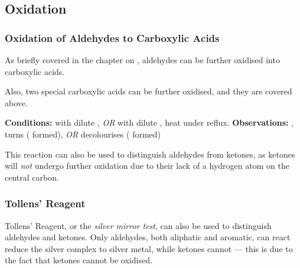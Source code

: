 

		\subsection{Oxidation}

			\subsubsection{Oxidation of Aldehydes to Carboxylic Acids}

				As briefly covered in the chapter on \hyperlink{CompleteOxidationOfPrimaryAlcohols}{}, aldehydes can be
				further oxidised into carboxylic acids.

				Also, two special carboxylic acids can be further oxidised, and they are covered above.

				\vspace{1.5em}
				\vbox{\textbf{Conditions:}	\tabto{35mm} with dilute , \textit{OR}  with dilute ,
											\tabto{35mm}heat under reflux.}
				\vspace{0.75em}
				\vbox{\textbf{Observations:}\tabto{35mm} , turns 
														( formed), \textit{OR}
											\tabto{35mm}  decolourises ( formed)}


				This reaction can also be used to distinguish aldehydes from ketones, as ketones will \textit{not} undergo further oxidation
				due to their lack of a hydrogen atom on the central carbon.


			\subsubsection{Tollens' Reagent}

				Tollens' Reagent, or the \textit{silver mirror test}, can also be used to distinguish aldehydes and ketones. Only aldehydes,
				both aliphatic and aromatic, can react reduce the silver complex to silver metal, while ketones cannot --- this is due to the
				fact that ketones cannot be oxidised.

